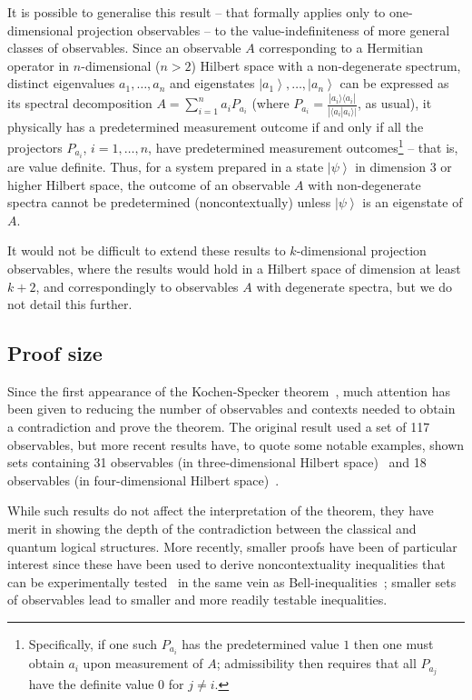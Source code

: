 \documentclass[%
 superscriptaddress,
 preprint,
 showpacs,
 showkeys,
 nofootinbib,
  amsmath,amssymb,
  aps,
  longbibliography,
  floatfix,
 ]{revtex4-1}
\theoremstyle{definition}
\newcommand{\bra}[1]{\left< #1 \right|}
\newcommand{\ket}[1]{\left| #1 \right>}
\newcommand{\iprod}[2]{\langle #1 | #2 \rangle}
\newcommand{\oprod}[2]{| #1 \rangle\langle #2 |}
\begin{document}
{\color{brown}
It is possible to generalise this result -- that formally applies only to {\color{blue} one-dimensional} projection observables --
to the value-indefiniteness of more general classes of observables.
Since an observable $A$
{\color{green}corresponding to a Hermitian operator in $n$-dimensional ($n>2$) Hilbert space}
with a non-degenerate spectrum, distinct eigenvalues $a_1,\dots,a_n$ and eigenstates $\ket{a_1},\dots,\ket{a_n}$
can be expressed as its spectral decomposition
$A=\sum_{i=1}^n a_i P_{a_i}$ (where $P_{a_i}=\frac{\oprod{a_i}{a_i}}{|\iprod{a_i}{a_i}|}$, as usual),
it physically has a predetermined measurement outcome if and only if {\color{blue}all}  the projectors {\color{blue}$P_{a_i}$, $i=1,\dots, n$,
have} predetermined measurement outcomes\footnote{{\color{blue}Specifically, if one such $P_{a_i}$ has the predetermined value $1$ then one must obtain $a_i$ upon measurement of $A$; admissibility then requires that all $P_{a_j}$ have the definite value 0 for $j\neq i$.}} -- that is, {\color{blue}are} value definite.
Thus, for a system prepared in a state $\ket{\psi}$ in dimension 3 or higher Hilbert space, the outcome of an observable $A$ with non-degenerate spectra cannot be predetermined (noncontextually) unless $\ket{\psi}$ is an eigenstate of $A$.

It would not be difficult to extend these results to $k$-dimensional projection observables, where the results would hold in a Hilbert space of dimension at least $k+2$, and correspondingly to observables $A$ with degenerate spectra, but we do not detail this further.
}

\subsection{Proof size}

Since the first appearance of the Kochen-Specker theorem~\cite{Kochen:1967fk}, much attention has been given to reducing the number of observables and contexts needed to obtain a contradiction and prove the theorem.
The original result used a set of 117 observables, but more recent results have, to quote some notable examples, shown sets containing 31 observables (in three-dimensional Hilbert space)~\cite{Peres:1991ys} and 18 observables (in four-dimensional Hilbert space)~\cite{Cabello:1996zr}.

While such results do not affect the interpretation of the theorem, they have merit in showing the depth of the contradiction between the classical and quantum logical structures.
More recently, smaller proofs have been of particular interest since these have been used to derive noncontextuality inequalities that can be experimentally tested~\cite{Cabello:2008hc} in the same vein as Bell-inequalities~\cite{Bell:1966uq};
smaller sets of observables lead to smaller and more readily testable inequalities.
\end{document}
